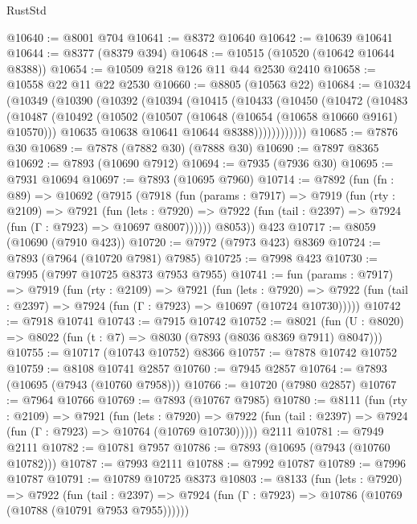\begin{lexlean}{RustStd}
\begin{coremodule}
{\begin{coremodule}
{{{{{{{{{{{{{{{{{{{{{{{{{{{{{{{{{{{{{{{{{{{{{{{{{{@10640 := @8001 @704
@10641 := @8372 @10640
@10642 := @10639 @10641
@10644 := @8377 (@8379 @394)
@10648 := @10515 (@10520 (@10642 @10644 @8388))
@10654 := @10509 @218 @126 @11 @44 @2530 @2410
@10658 := @10558 @22 @11 @22 @2530
@10660 := @8805 (@10563 @22)
@10684 := @10324
    (@10349
      (@10390
        (@10392
          (@10394
            (@10415
              (@10433
                (@10450
                  (@10472
                    (@10483
                      (@10487
                        (@10492
                          (@10502
                            (@10507 (@10648 (@10654 (@10658 @10660 @9161) @10570)))
                            @10635
                            @10638
                            @10641
                            @10644
                            @8388))))))))))))
@10685 := @7876 @30
@10689 := @7878 (@7882 @30) (@7888 @30)
@10690 := @7897 @8365
@10692 := @7893 (@10690 @7912)
@10694 := @7935 (@7936 @30)
@10695 := @7931 @10694
@10697 := @7893 (@10695 @7960)
@10714 := @7892
    (fun (fn : @89) =>
    @10692
      (@7915
        (@7918
          (fun (params : @7917) =>
          @7919
            (fun (rty : @2109) =>
            @7921
              (fun (lets : @7920) =>
              @7922 (fun (tail : @2397) => @7924 (fun (Γ : @7923) => @10697 @8007))))))
        @8053))
    @423
@10717 := @8059 (@10690 (@7910 @423))
@10720 := @7972 (@7973 @423) @8369
@10724 := @7893 (@7964 (@10720 @7981) @7985)
@10725 := @7998 @423
@10730 := @7995 (@7997 @10725 @8373 @7953 @7955)
@10741 := fun (params : @7917) =>
  @7919
    (fun (rty : @2109) =>
    @7921
      (fun (lets : @7920) =>
      @7922 (fun (tail : @2397) => @7924 (fun (Γ : @7923) => @10697 (@10724 @10730)))))
@10742 := @7918 @10741
@10743 := @7915 @10742
@10752 := @8021 (fun (U : @8020) => @8022 (fun (t : @7) => @8030 (@7893 (@8036 @8369 @7911) @8047)))
@10755 := @10717 (@10743 @10752) @8366
@10757 := @7878 @10742 @10752
@10759 := @8108 @10741 @2857
@10760 := @7945 @2857
@10764 := @7893 (@10695 (@7943 (@10760 @7958)))
@10766 := @10720 (@7980 @2857)
@10767 := @7964 @10766
@10769 := @7893 (@10767 @7985)
@10780 := @8111
    (fun (rty : @2109) =>
    @7921
      (fun (lets : @7920) =>
      @7922 (fun (tail : @2397) => @7924 (fun (Γ : @7923) => @10764 (@10769 @10730)))))
    @2111
@10781 := @7949 @2111
@10782 := @10781 @7957
@10786 := @7893 (@10695 (@7943 (@10760 @10782)))
@10787 := @7993 @2111
@10788 := @7992 @10787
@10789 := @7996 @10787
@10791 := @10789 @10725 @8373
@10803 := @8133
    (fun (lets : @7920) =>
    @7922
      (fun (tail : @2397) =>
      @7924 (fun (Γ : @7923) => @10786 (@10769 (@10788 (@10791 @7953 @7955))))))
}}}}}}}}}}}}}}}}}}}}}}}}}}}}}}}}}}}}}}}}}}}}}}}}}}
\end{coremodule}}
\end{coremodule}
\end{lexlean}
